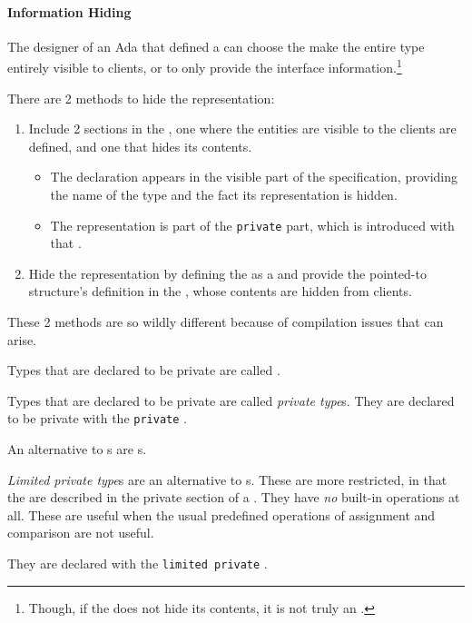 \paragraph{Information Hiding}\label{par:Ada_Info_Hiding}
The designer of an Ada  that defined a  can choose the make the entire type entirely visible to clients, or to only provide the interface information.\footnote{Though, if the  does not hide its contents, it is not truly an .}

There are 2 methods to hide the representation:
\begin{enumerate}[noitemsep]
\item Include 2 sections in the , one where the entities are visible to the clients are defined, and one that hides its contents.
  \begin{itemize}[noitemsep]
  \item The declaration appears in the visible part of the specification, providing the name of the type and the fact its representation is hidden.
  \item The representation is part of the \texttt{private} part, which is introduced with that .
  \end{itemize}
\item Hide the representation by defining the  as a  and provide the pointed-to structure's definition in the , whose contents are hidden from clients.
\end{enumerate}
These 2 methods are so wildly different because of compilation issues that can arise.

Types that are declared to be private are called .
\begin{definition}\label{def:Ada_Private_Type}
  Types that are declared to be private are called \emph{private type}s.
  They are declared to be private with the \texttt{private} .
\end{definition}

An alternative to s are s.
\begin{definition}\label{def:Ada_Limited_Private_Type}
  \emph{Limited private type}s are an alternative to s.
  These are more restricted, in that the are described in the private section of a .
  They have \emph{no} built-in operations at all.
  These are useful when the usual predefined operations of assignment and comparison are not useful.

  They are declared with the \texttt{limited private} .
\end{definition}

